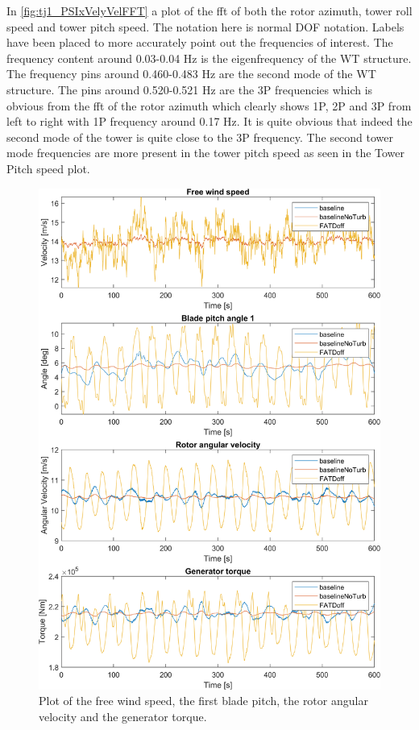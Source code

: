 In \cref{fig:tj1_PSIxVelyVelFFT} a plot of the fft of both the rotor azimuth, tower roll speed and tower pitch speed. The notation here is normal DOF notation. Labels have been placed to more accurately point out the frequencies of interest. The frequency content around 0.03-0.04 Hz is the eigenfrequency of the WT structure. The frequency pins around 0.460-0.483 Hz are the second mode of the WT structure. The pins around 0.520-0.521 Hz are the 3P frequencies which is obvious from the fft of the rotor azimuth which clearly shows 1P, 2P and 3P from left to right with 1P frequency around 0.17 Hz. It is quite obvious that indeed the second mode of the tower is quite close to the 3P frequency. The second tower mode frequencies are more present in the tower pitch speed as seen in the Tower Pitch speed plot.

\begin{figure}[ht]
	\centering
	\includegraphics[width=0.8\linewidth]{Graphics/TestResults/tj01/VfreeToMgen.png}
	\caption{Plot of the free wind speed, the first blade pitch, the rotor angular velocity and the generator torque.}
	\label{fig:tj1:vfreetomgen}
\end{figure}

